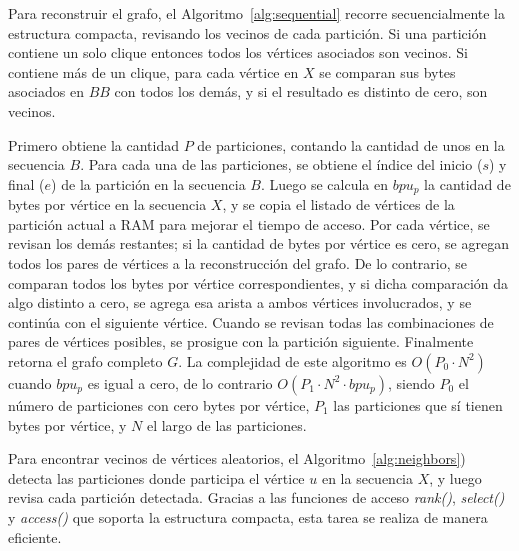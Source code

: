Para reconstruir el grafo, el Algoritmo~\ref{alg:sequential} recorre secuencialmente la estructura compacta, revisando los vecinos de cada partición. Si una partición contiene un solo clique entonces todos los vértices asociados son vecinos. Si contiene más de un clique, para cada vértice en $X$ se comparan sus bytes asociados en $BB$ con todos los demás, y si el resultado es distinto de cero, son vecinos. %

Primero obtiene la cantidad $P$ de particiones, contando la cantidad de unos en la secuencia $B$. Para cada una de las particiones, se obtiene el índice del inicio ($s$) y final ($e$) de la partición en la secuencia $B$. Luego se calcula en $bpu_{p}$ la cantidad de bytes por vértice en la secuencia $X$, y se copia el listado de vértices de la partición actual a RAM para mejorar el tiempo de acceso. Por cada vértice, se revisan los demás restantes; si la cantidad de bytes por vértice es cero, se agregan todos los pares de vértices a la reconstrucción del grafo. De lo contrario, se comparan todos los bytes por vértice correspondientes, y si dicha comparación da algo distinto a cero, se agrega esa arista a ambos vértices involucrados, y se continúa con el siguiente vértice. Cuando se revisan todas las combinaciones de pares de vértices posibles, se prosigue con la partición siguiente. Finalmente retorna el grafo completo $G$.  La complejidad de este algoritmo es $O(P_{0} \cdot N^{2})$ cuando $bpu_{p}$ es igual a cero, de lo contrario $O(P_{1} \cdot N^{2} \cdot bpu_{p})$, siendo $P_{0}$ el número de particiones con cero bytes por vértice, $P_{1}$ las particiones que sí tienen bytes por vértice, y $N$ el largo de las particiones.

Para encontrar vecinos de vértices aleatorios, el Algoritmo~\ref{alg:neighbors}) detecta las particiones donde participa el vértice $u$ en la secuencia $X$, y luego revisa cada partición detectada. Gracias a las funciones de acceso \textit{rank()}, \textit{select()} y \textit{access()} que soporta la estructura compacta, esta tarea se realiza de manera eficiente.

